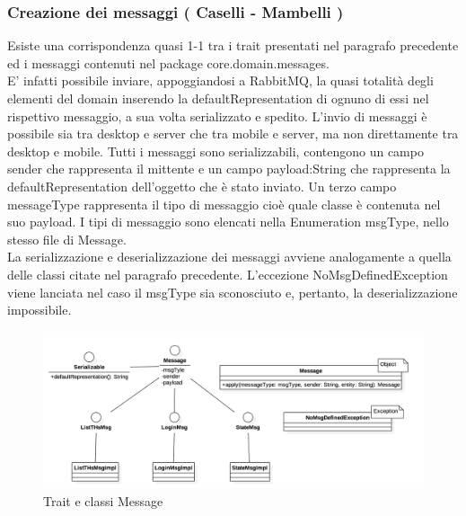 \documentclass[12pt, italian]{article}
\begin{document}
\subsubsection{Creazione dei messaggi ( Caselli - Mambelli )}
Esiste una corrispondenza quasi 1-1 tra i trait presentati nel paragrafo precedente ed i messaggi contenuti nel package core.domain.messages.\\
E' infatti possibile inviare, appoggiandosi a RabbitMQ, la quasi totalità degli elementi del domain inserendo la defaultRepresentation di ognuno di essi nel rispettivo messaggio, a sua volta serializzato e spedito.
L'invio di messaggi è possibile sia tra desktop e server che tra mobile e server, ma non direttamente tra desktop e mobile.
Tutti i messaggi sono serializzabili, contengono un campo sender che rappresenta il mittente e un campo payload:String che rappresenta la defaultRepresentation dell'oggetto che è stato inviato.
Un terzo campo messageType rappresenta il tipo di messaggio cioè quale classe è contenuta nel suo payload.
I tipi di messaggio sono elencati nella Enumeration msgType, nello stesso file di Message.\\
La serializzazione e deserializzazione dei messaggi avviene analogamente a quella delle classi citate nel paragrafo precedente.
L'eccezione NoMsgDefinedException viene lanciata nel caso il msgType sia sconosciuto e, pertanto, la deserializzazione impossibile.

\begin{figure}[H]
	\centering
	\includegraphics[width=1\textwidth]{img/diagram02.png}
	\caption{Trait e classi Message}
\end{figure}

\end{document}
